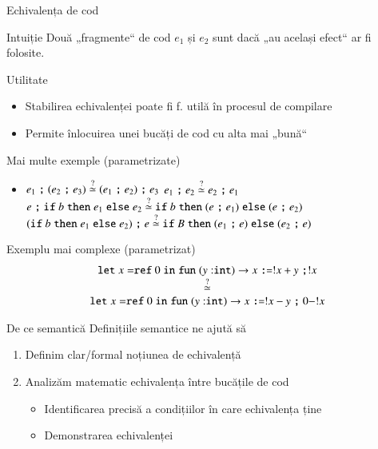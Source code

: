 \documentclass[xcolor=pdftex,romanian,colorlinks]{beamer}
\begin{document}
\begin{frame}{Echivalența de cod}
\begin{block}{Intuiție}
Două „fragmente“ de cod $e_1$ și $e_2$ sunt  dacă „au același efect“  ar fi folosite.
\end{block}

\vfill \begin{block}{Utilitate}
\begin{itemize}
\item Stabilirea echivalenței poate fi f. utilă în procesul de compilare
\item Permite înlocuirea unei bucăți de cod cu alta mai „bună“ 
\end{itemize}
\end{block}

\end{frame}

\begin{frame}{Mai multe exemple (parametrizate)}
\begin{itemize}
\item $e_1 \terminal{;} (e_2 \terminal{;} e_3) \stackrel?\simeq (e_1 \terminal{;} e_2) \terminal{;} e_3$
\vitem $e_1 \terminal{;} e_2 \stackrel?\simeq e_2 \terminal{;} e_1$
\vitem $e \terminal{;} {\Sif b \Sthen e_1 \Selse e_2}  \stackrel?\simeq {\Sif b \Sthen (e \terminal{;} e_1) \Selse (e \terminal{;} e_2)}$
\vitem $({\Sif b \Sthen e_1 \Selse e_2}) \terminal{;} e  \stackrel?\simeq {\Sif B \Sthen (e_1 \terminal{;} e) \Selse (e_2 \terminal{;} e)}$
\end{itemize}

\end{frame}


\begin{frame}{Exemplu mai complexe (parametrizat)}
\[\begin{array}{c}\Slet x = \Sref 0 \Sin {\Sfun (y:\Sint) \rightarrow x \terminal{:=} !x + y \terminal{;} !x}
\\
\stackrel{?}{\simeq}
\\
\Slet x = \Sref 0 \Sin {\Sfun (y:\Sint) \rightarrow x \terminal{:=} !x - y \terminal{;} 0 - !x}
\end{array}\]


\end{frame}

\begin{frame}{De ce semantică}
Definițiile semantice ne ajută să 
\begin{enumerate}
\item Definim clar/formal noțiunea de echivalență
\item Analizăm matematic echivalența între bucățile de cod
\begin{itemize}
\item Identificarea precisă a condițiilor în care echivalența ține
\item Demonstrarea echivalenței
\end{itemize}
\end{enumerate}
\end{frame}
\end{document}
